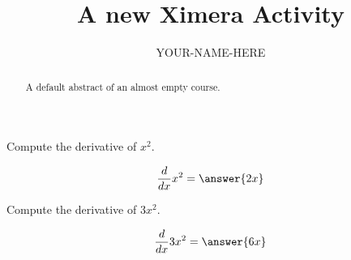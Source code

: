 \documentclass{ximera}
\title{A new Ximera Activity}
\author{YOUR-NAME-HERE}
\begin{document}
\begin{abstract}
    A default abstract of an almost empty course.
\end{abstract}
\maketitle


\begin{exercise}
Compute the derivative of $x^2$.
\begin{prompt}
\[
\frac{d}{dx} x^2 = \answer{2x}
\]
\end{prompt}    
\end{exercise}



\begin{exercise}
Compute the derivative of $3x^2$.
\begin{prompt}
\[
\frac{d}{dx} 3x^2 = \answer{6x}
\]
\end{prompt}    
\end{exercise}
\end{document}
